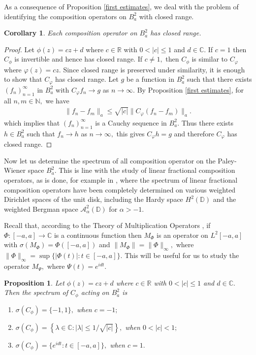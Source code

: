 \documentclass[11pt]{amsart}%
\numberwithin{equation}{section}
\theoremstyle{plain}
\newtheorem{cor}[thm]{Corollary}
\newtheorem{prop}[thm]{Proposition}
\theoremstyle{definition}
\theoremstyle{definition}
\begin{document}
As a consequence of Proposition \ref{first estimates}, we deal with the problem of identifying the composition operators on $B^2_a$ with closed range. 


\begin{cor} Each composition operator on $B^2_a$ has closed range.
\end{cor}

\begin{proof} Let $\phi(z)=cz+d$ where $c\in \mathbb{R}$ with $0<|c|\leq 1$ and $d\in \mathbb{C}.$ If $c=1$ then $C_{\phi}$ is invertible and hence has closed range. If $c\neq 1,$ then $C_{\phi}$ is similar to $C_{\varphi}$ where $\varphi(z)=cz.$ Since closed range is preserved under similarity, it is enough to show that $C_{\varphi}$ has closed range. Let $g$ be a function in $B^2_a$ such that there exists $(f_n)_{n=1}^{\infty}$ in $B^2_a$ with $C_{\varphi}f_n\to g$ as $n\to \infty.$ By Proposition \ref{first estimates}, for all $n,m\in \mathbb{N},$ we have
\begin{align*}
\|f_n-f_m\|_a\leq \sqrt{|c|}\|C_{\varphi}(f_n-f_m)\|_a.
\end{align*}
which implies that $(f_n)_{n=1}^{\infty}$ is a Cauchy sequence in $B^2_a.$ Thus there exists $h\in B^2_a$ such that $f_n\to h$ as $n\to \infty,$ this gives $C_{\varphi}h=g$ and therefore $C_{\varphi}$ has closed range. 
\end{proof}

Now let us determine the spectrum of all composition operator on the Paley-Wiener space $B^2_a.$ This is line with the study of linear fractional composition operators, as is done, for example in \cite{Cowen, Gallardo-Rikka, Higdon}, where the spectrum of linear fractional composition operators have been completely determined on various weighted Dirichlet spaces of the unit disk, including the Hardy space $H^2(\mathbb{D})$ and the weighted Bergman space $\mathcal{A}^2_{\alpha}(\mathbb{D})$ for $\alpha>-1.$ 

Recall that, according to the Theory of Multiplication Operators \cite{Conway}, if $\Phi:[-a,a]\to \mathbb{C}$ is a continuous function then $M_{\Phi}$ is an operator on $L^2[-a,a]$ with $\sigma(M_{\Phi})=\Phi([-a,a])$ and $\|M_{\Phi}\|=\|\Phi\|_{\infty},$ where $\|\Phi\|_{\infty}=\sup\{|\Phi(t)|:t\in [-a,a]\}.$ This will be useful for us to study the operator $M_{\Psi},$ where $\Psi(t)=e^{idt}.$


\begin{prop}\label{spectrum} Let $\phi(z)=cz+d$ where $c\in \mathbb{R}$ with $0<|c|\leq 1$ and $d\in \mathbb{C}.$ Then the spectrum of $C_{\phi}$ acting on $B^2_a$ is

\begin{enumerate}[label=\textnormal{(\arabic*)}]
    \item \label{spec1} $\sigma(C_{\phi})=\{-1,1\},$ when $c=-1;$
    \item \label{spec2} $\sigma(C_{\phi})=\left\{ \lambda \in \mathbb{C}: |\lambda|\leq 1/\sqrt{|c|} 
\right\},$ when $0<|c|<1;$
    \item \label{spec3} $\sigma(C_{\phi})=\{e^{idt}:t\in [-a, a]\},$ when $c=1.$
\end{enumerate}
\end{prop}
\end{document}
